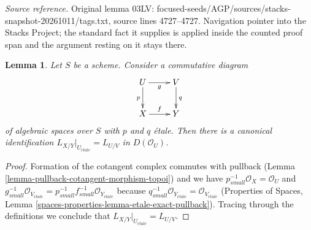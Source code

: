 \documentclass[10pt,a4paper]{amsart}
\theoremstyle{plain}
\newtheorem{lemma}[subsection]{Lemma}
\theoremstyle{definition}
\theoremstyle{remark}
\numberwithin{equation}{subsection}
\def\etale{{\acute{e}tale}}
\begin{document}
\noindent\textit{Source reference.} Original lemma 03LV: focused-seeds/AGP/sources/stacks-snapshot-20261011/tags.txt, source lines 4727--4727. Navigation pointer into the Stacks Project; the standard fact it supplies is applied inside the counted proof span and the argument resting on it stays there.\par\medskip
\begin{lemma}
\label{lemma-etale-localization}
Let $S$ be a scheme. Consider a commutative diagram
$$
\xymatrix{
U \ar[d]_p \ar[r]_g & V \ar[d]^q \\
X \ar[r]^f & Y
}
$$
of algebraic spaces over $S$ with $p$ and $q$ \'etale.
Then there is a canonical identification
$L_{X/Y}|_{U_\etale} = L_{U/V}$ in $D(\mathcal{O}_U)$.
\end{lemma}

\begin{proof}
Formation of the cotangent complex commutes with pullback
(Lemma \ref{lemma-pullback-cotangent-morphism-topoi}) and
we have $p_{small}^{-1}\mathcal{O}_X = \mathcal{O}_U$ and
$g_{small}^{-1}\mathcal{O}_{V_\etale} =
p_{small}^{-1}f_{small}^{-1}\mathcal{O}_{Y_\etale}$
because $q_{small}^{-1}\mathcal{O}_{Y_\etale} =
\mathcal{O}_{V_\etale}$
(Properties of Spaces, Lemma
\ref{spaces-properties-lemma-etale-exact-pullback}).
Tracing through the definitions we conclude that
$L_{X/Y}|_{U_\etale} = L_{U/V}$.
\end{proof}
\end{document}
